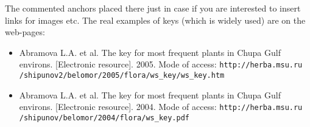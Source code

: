 \documentclass[a4paper,12pt]{article}
\begin{document}
The commented anchors placed there just in case if you are interested to insert links for images etc. The real examples of keys (which is widely used) are on the web-pages:

\begin{itemize}

\item Abramova L.A. et al. The key for most frequent plants in Chupa Gulf environs. [Electronic resource]. 2005. Mode of access:
\texttt{http://herba.msu.ru\\/shipunov2/belomor/2005/flora/ws\_key/ws\_key.htm}

\item Abramova L.A. et al. The key for most frequent plants in Chupa Gulf environs. [Electronic resource]. 2004. Mode of access:
\texttt{http://herba.msu.ru\\/shipunov/belomor/2004/flora/ws\_key.pdf}

\end{itemize}
\end{document}
